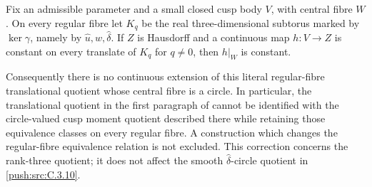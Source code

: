 \begin{proposition}\label{push:src:C.3.12}
Fix an admissible parameter and a small closed cusp body $V$, with
central fibre $W$. On every regular fibre let $K_q$ be the real
three-dimensional subtorus marked by $\ker\gamma$, namely by
$\widehat u,\widehat w,\widehat\delta$.
If $Z$ is Hausdorff and a continuous map $h:V\to Z$ is constant
on every translate of $K_q$ for $q\ne0$, then $h|_W$ is constant.

Consequently there is no continuous extension of this literal
regular-fibre translational quotient whose central fibre is a
circle. In particular, the translational quotient in the first
paragraph of \citet[Remark 8.3]{E26} cannot be identified with the
circle-valued cusp moment quotient described there while retaining
those equivalence classes on every regular fibre. A construction
which changes the regular-fibre equivalence relation is not excluded.
This correction concerns the rank-three quotient; it does not affect
the smooth $\widehat\delta$-circle quotient in \ref{push:src:C.3.10}.
\end{proposition}

